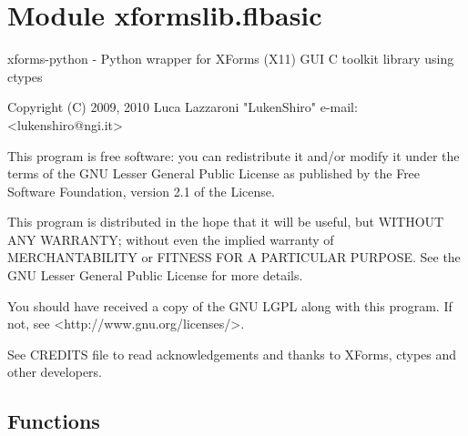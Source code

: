 %
%
%


\section{Module xformslib.flbasic}

    \label{xformslib:flbasic}
xforms-python - Python wrapper for XForms (X11) GUI C toolkit library using
ctypes

Copyright (C) 2009, 2010  Luca Lazzaroni "LukenShiro" e-mail: 
{\textless}lukenshiro@ngi.it{\textgreater}

This program is free software: you can redistribute it and/or modify it 
under the terms of the GNU Lesser General Public License as published by 
the Free Software Foundation, version 2.1 of the License.

This program is distributed in the hope that it will be useful, but WITHOUT
ANY WARRANTY; without even the implied warranty of MERCHANTABILITY or 
FITNESS FOR A PARTICULAR PURPOSE. See the GNU Lesser General Public License
for more details.

You should have received a copy of the GNU LGPL along with this program. If
not, see {\textless}http://www.gnu.org/licenses/{\textgreater}.

See CREDITS file to read acknowledgements and thanks to XForms, ctypes and 
other developers.



  \subsection{Functions}

    \label{xformslib:flbasic:FL_IS_UPBOX}


